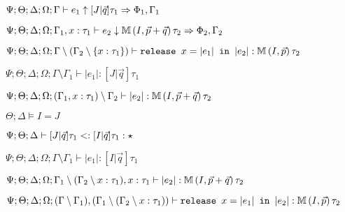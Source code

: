 {{{      $\Psi ; \Theta ; \Delta ; \Omega ; \Gamma \vdash e_1 \uparrow [J | \vec{q}] \tau_1 \Rightarrow \Phi_1,\Gamma_1$
     
      $\Psi ; \Theta ; \Delta ; \Omega ; \Gamma_1, x : \tau_1 \vdash e_2 \downarrow \mathbb{M} \, (I,\vec{p} + \vec{q}) \, \tau_2 \Rightarrow \Phi_2, \Gamma_2$
   }{
    $\Psi ; \Theta ; \Delta ; \Omega ; \Gamma \setminus (\Gamma_2 \setminus \{x : \tau_1\}) \vdash \texttt{release } x = |e_1| \texttt{ in }|e_2| : \mathbb{M} \, (I,\vec{p}) \, \tau_2$
   }
   
   
    $\Psi ; \Theta ; \Delta ; \Omega ; \Gamma \setminus \Gamma_1 \vdash |e_1| : [J | \vec{q}] \tau_1$
   
   
    $\Psi ; \Theta ; \Delta ; \Omega ; (\Gamma_1, x : \tau_1) \setminus \Gamma_2 \vdash |e_2| : \mathbb{M} \, (I,\vec{p} + \vec{q}) \, \tau_2$
   
   
    $\Theta ; \Delta \vDash I = J$
   
   
    $\Psi ; \Theta ; \Delta \vdash [J|\vec{q}] \tau_1 <: [I|\vec{q}] \tau_1 : \star$
   
   
    $\Psi ; \Theta ; \Delta ; \Omega ; \Gamma \setminus \Gamma_1 \vdash |e_1| : [I | \vec{q}] \tau_1$
   
   
    $\Psi ; \Theta ; \Delta ; \Omega ; \Gamma_1 \setminus (\Gamma_2 \setminus x : \tau_1), x : \tau_1 \vdash |e_2| : \mathbb{M} \, (I,\vec{p} + \vec{q}) \, \tau_2$
   
   
    $\Psi ; \Theta ; \Delta ; \Omega ; (\Gamma \setminus \Gamma_1),(\Gamma_1 \setminus (\Gamma_2 \setminus x : \tau_1)) \vdash \texttt{release } x = |e_1| \texttt{ in }|e_2| : \mathbb{M} \, (I,\vec{p}) \, \tau_2$
   
 }
 
 }
